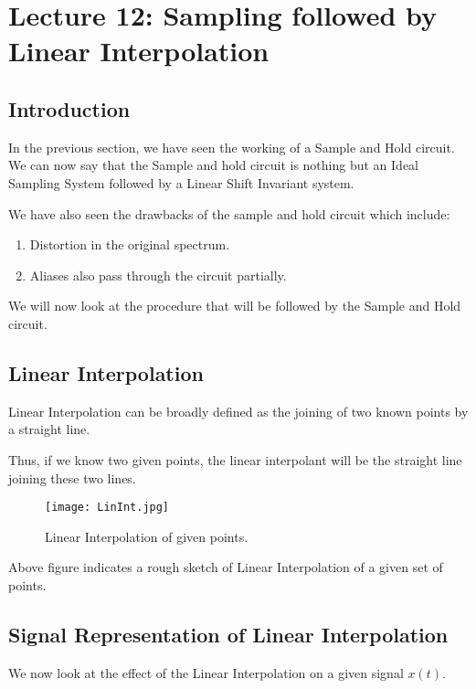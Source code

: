 \section{Lecture 12: Sampling followed by Linear Interpolation}


\subsection{Introduction}
In the previous section, we have seen the working of a Sample and Hold circuit. We can now say that the Sample and hold circuit is nothing but an Ideal Sampling System followed by a Linear Shift Invariant system.

We have also seen the drawbacks of the sample and hold circuit which include:

\begin{enumerate}
\item Distortion in the original spectrum.
\item Aliases also pass through the circuit partially.
\end{enumerate}

We will now look at the procedure that will be followed by the Sample and Hold circuit.
\subsection{Linear Interpolation}
Linear Interpolation can be broadly defined as the joining of two known points by a straight line.

Thus, if we know two given points, the linear interpolant will be the straight line joining these two lines. 

\begin{figure}[h]
\centering
\texttt{[image: LinInt.jpg]}
\caption{Linear Interpolation of given points.}
\end{figure}
\label{sec:examples}

Above figure indicates a rough sketch of Linear Interpolation of a given set of points. 



\pagebreak

\subsection{Signal Representation of Linear Interpolation}

We now look at the effect of the Linear Interpolation on a given signal $x(t)$.

